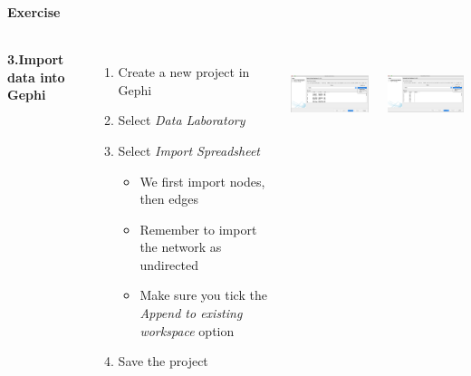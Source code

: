 \documentclass[8pt]{beamer}
\begin{document}
\begin{frame}
\frametitle{\insertsection}
\framesubtitle{Exercise}


\begin{columns}

\textbf{3.Import data into Gephi}
\begin{enumerate}
	\item Create a new project in Gephi
	\item Select \textit{Data Laboratory}
	\item Select \textit{Import Spreadsheet}
		  \begin{itemize}
		  \item 	We first import nodes, then edges
		  \item Remember to import the network as undirected
		  \item Make sure you tick the \textit{Append to existing workspace} option
		  \end{itemize}
	\item Save the project
\end{enumerate}


\footnotesize
\centering
\includegraphics[height = 2.5cm]{nodes_import.png}\\

\medskip
\medskip

\includegraphics[height = 2.5cm]{edges_import.png}\\


\end{columns}

\end{frame}

\end{document}
